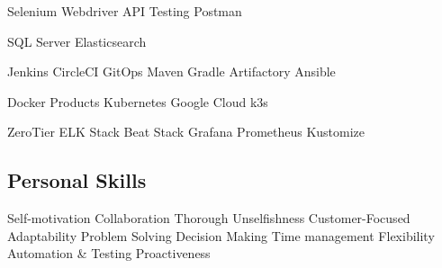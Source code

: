 \documentclass[]{openfont}
\begin{document}
\begin{minipage}[t]{0.33\textwidth}
\textbullet{}Selenium 
\textbullet{}Webdriver
\textbullet{}API Testing
\textbullet{}Postman

\textbullet{}SQL Server 
\textbullet{}Elasticsearch

\textbullet{}Jenkins 
\textbullet{}CircleCI 
\textbullet{}GitOps 
\textbullet{}Maven
\textbullet{}Gradle
\textbullet{}Artifactory
\textbullet{}Ansible

\textbullet{}Docker Products 
\textbullet{}Kubernetes
\textbullet{}Google Cloud
\textbullet{}k3s

\textbullet{}ZeroTier
\textbullet{}ELK Stack 
\textbullet{}Beat Stack
\textbullet{}Grafana
\textbullet{}Prometheus
\textbullet{}Kustomize

\sectionsep

\subsection{Personal Skills}

\textbullet{}Self-motivation 
\textbullet{}Collaboration 
\textbullet{}Thorough
\textbullet{}Unselfishness
\textbullet{}Customer-Focused
\textbullet{}Adaptability 
\textbullet{}Problem Solving 
\textbullet{}Decision Making 
\textbullet{}Time management
\textbullet{}Flexibility
\textbullet{}Automation \& Testing
\textbullet{}Proactiveness

\sectionsep

%
%

\end{minipage} 
\hfill
\end{document}
